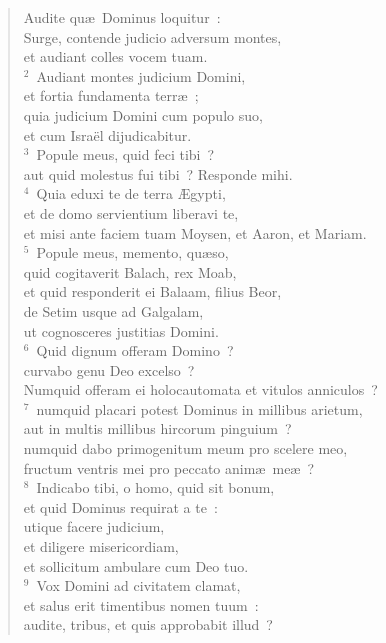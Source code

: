 \begin{flushleft}\begin{verse}\vspace{-19pt}Audite qu\ae\ Dominus loquitur~:\\ Surge, contende judicio adversum montes,\\ et audiant colles vocem tuam.\\
${}^{2}$~Audiant montes judicium Domini,\\ et fortia fundamenta terr\ae~;\\ quia judicium Domini cum populo suo,\\ et cum Isra\"el dijudicabitur.\\
${}^{3}$~Popule meus, quid feci tibi~?\\ aut quid molestus fui tibi~? Responde mihi.\\
${}^{4}$~Quia eduxi te de terra \AE gypti,\\ et de domo servientium liberavi te,\\ et misi ante faciem tuam Moysen, et Aaron, et Mariam.\\
${}^{5}$~Popule meus, memento, qu\ae so,\\ quid cogitaverit Balach, rex Moab,\\ et quid responderit ei Balaam, filius Beor,\\ de Setim usque ad Galgalam,\\ ut cognosceres justitias Domini.\\
${}^{6}$~Quid dignum offeram Domino~?\\ curvabo genu Deo excelso~?\\ Numquid offeram ei holocautomata et vitulos anniculos~?\\
${}^{7}$~numquid placari potest Dominus in millibus arietum,\\ aut in multis millibus hircorum pinguium~?\\ numquid dabo primogenitum meum pro scelere meo,\\ fructum ventris mei pro peccato anim\ae\ me\ae~?\\
${}^{8}$~Indicabo tibi, o homo, quid sit bonum,\\ et quid Dominus requirat a te~:\\ utique facere judicium,\\ et diligere misericordiam,\\ et sollicitum ambulare cum Deo tuo.\\
${}^{9}$~Vox Domini ad civitatem clamat,\\ et salus erit timentibus nomen tuum~:\\ audite, tribus, et quis approbabit illud~?\\

\end{verse}
\end{flushleft}
